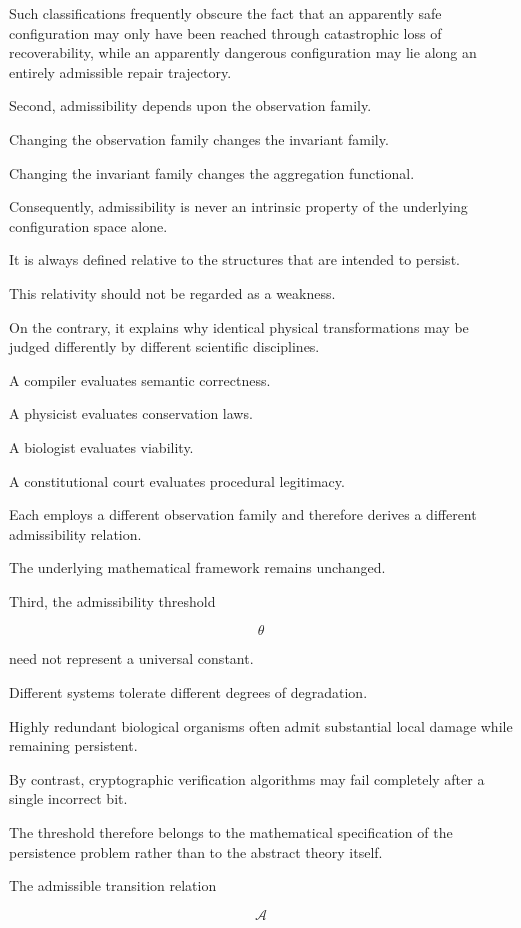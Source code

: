 \documentclass[11pt]{book}
\numberwithin{equation}{chapter}
\theoremstyle{definition}
\theoremstyle{plain}
\begin{document}
Such classifications frequently obscure the fact that an apparently safe configuration may only have been reached through catastrophic loss of recoverability, while an apparently dangerous configuration may lie along an entirely admissible repair trajectory.

Second, admissibility depends upon the observation family.

Changing the observation family changes the invariant family.

Changing the invariant family changes the aggregation functional.

Consequently, admissibility is never an intrinsic property of the underlying configuration space alone.

It is always defined relative to the structures that are intended to persist.

This relativity should not be regarded as a weakness.

On the contrary, it explains why identical physical transformations may be judged differently by different scientific disciplines.

A compiler evaluates semantic correctness.

A physicist evaluates conservation laws.

A biologist evaluates viability.

A constitutional court evaluates procedural legitimacy.

Each employs a different observation family and therefore derives a different admissibility relation.

The underlying mathematical framework remains unchanged.

Third, the admissibility threshold

\[
\theta
\]

need not represent a universal constant.

Different systems tolerate different degrees of degradation.

Highly redundant biological organisms often admit substantial local damage while remaining persistent.

By contrast, cryptographic verification algorithms may fail completely after a single incorrect bit.

The threshold therefore belongs to the mathematical specification of the persistence problem rather than to the abstract theory itself.

The admissible transition relation

\[
\mathcal{A}
\]
\end{document}
